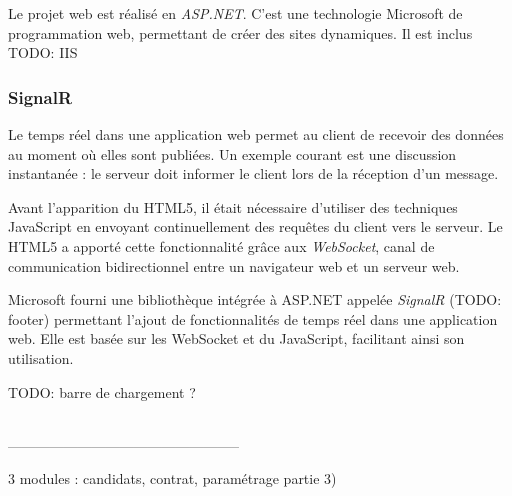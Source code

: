 Le projet web est réalisé en \textit{ASP.NET}. C'est une technologie Microsoft de programmation web, permettant de créer des sites dynamiques. Il est inclus
TODO: IIS

\subsubsection{SignalR}

Le temps réel dans une application web permet au client de recevoir des données au moment où elles sont publiées. Un exemple courant est une discussion instantanée : le serveur doit informer le client lors de la réception d'un message.

Avant l'apparition du HTML5, il était nécessaire d'utiliser des techniques JavaScript en envoyant continuellement des requêtes du client vers le serveur. Le HTML5 a apporté cette fonctionnalité grâce aux \textit{WebSocket}, canal de communication bidirectionnel entre un navigateur web et un serveur web.

Microsoft fourni une bibliothèque intégrée à ASP.NET appelée \textit{SignalR} (TODO: footer) permettant l'ajout de fonctionnalités de temps réel dans une application web. Elle est basée sur les WebSocket et du JavaScript, facilitant ainsi son utilisation.

TODO: barre de chargement ?

~~\\--------------------------------------------------

3 modules : candidats, contrat, paramétrage partie 3)

